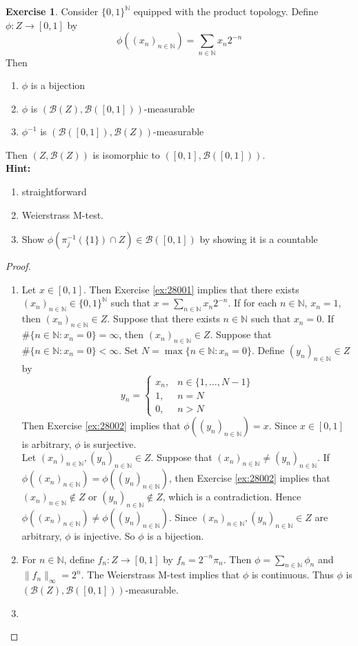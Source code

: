 \documentclass[12pt]{amsart}
\theoremstyle{definition}
\newtheorem{ex}[definition]{Exercise}
\newcommand{\N}{\mathbb{N}}
\newcommand{\MB}{\mathcal{B}}
\newcommand{\lex}[1]{\label{ex:#1}}
\newcommand{\rex}[1]{Exercise \ref{ex:#1}}
\begin{document}
	\begin{ex} \lex{28004} 
		Consider $\{0, 1\}^{\N}$ equipped with the product topology. Define $\phi: Z \rightarrow [0,1]$ by 
		$$\phi((x_n)_{n \in \N}) = \sum\limits_{n \in \N} x_n2^{-n}$$
		Then 
		\begin{enumerate}
			\item $\phi$ is a bijection
			\item $\phi$ is $(\MB(Z), \MB([0,1]))$-measurable
			\item $\phi^{-1}$ is $(\MB([0,1]), \MB(Z))$-measurable
		\end{enumerate}
		Then $(Z, \MB(Z))$ is isomorphic to $([0,1], \MB([0,1]))$. \\
		\textbf{Hint: } \begin{enumerate}
			\item straightforward
			\item Weierstrass M-test.
			\item Show $\phi(\pi_j^{-1}(\{1\}) \cap Z) \in \MB([0,1])$ by showing it is a countable  
		\end{enumerate} 
	\end{ex}

	\begin{proof}\
		\begin{enumerate}
			\item Let $x \in [0,1]$. Then \rex{28001} implies that there exists $(x_n)_{n \in \N} \in \{0,1\}^{\N}$ such that $x = \sum\limits_{n \in \N} x_n2^{-n}$. If for each $n \in \N$, $x_n = 1$, then $(x_n)_{n \in \N} \in Z$. Suppose that there exists $n \in \N$ such that $x_n = 0$. If $\# \{n \in \N: x_n = 0\} = \infty$, then $(x_n)_{n \in \N} \in Z$. Suppose that $ \# \{n \in \N: x_n = 0\} < \infty$. Set $N = \max \{ n \in \N: x_n = 0\}$. Define $(y_n)_{n \in \N} \in Z$ by 
			\[
			y_n = 
			\begin{cases}
				x_n, & n \in \{1, \ldots, N-1\} \\
				1, & n = N \\
				0, & n > N
			\end{cases}
			\]
			Then \rex{28002} implies that $\phi((y_n)_{n \in \N}) = x$. Since $x \in [0,1]$ is arbitrary, $\phi$ is surjective. \vspace{.2cm}\\  Let $(x_n)_{n \in \N}, (y_n)_{n \in \N} \in Z$. Suppose that $(x_n)_{n \in \N} \neq (y_n)_{n \in \N}$. If  $\phi((x_n)_{n \in \N}) = \phi((y_n)_{n \in \N})$, then \rex{28002} implies that $(x_n)_{n \in \N} \not \in Z$ or $(y_n)_{n \in \N} \not \in Z$, which is a contradiction. Hence $\phi((x_n)_{n \in \N}) \neq \phi((y_n)_{n \in \N})$. Since $(x_n)_{n \in \N}, (y_n)_{n \in \N} \in Z$ are arbitrary, $\phi$ is injective. So $\phi$ is a bijection. \\
			\item For $n \in \N$, define $f_n: Z \rightarrow [0, 1]$ by $f_n = 2^{-n}\pi_{n}$. Then $\phi = \sum\limits_{n \in \N} \phi_n$ and $\|f_n\|_{\infty} = 2^{n}$. The Weierstrass M-test implies that $\phi$ is continuous. Thus $\phi$ is $(\MB(Z), \MB([0,1]))$-measurable. \\
			\item 
		\end{enumerate}
	\end{proof}
	
\end{document}
